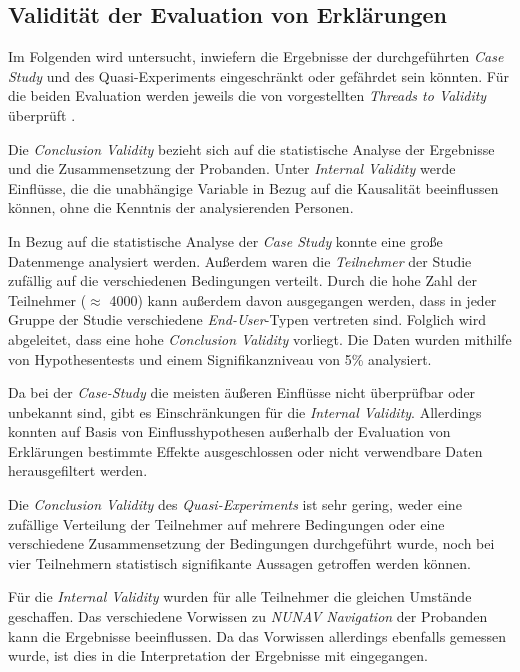 \subsection{Validität der Evaluation von Erklärungen}

Im Folgenden wird untersucht, inwiefern die Ergebnisse der durchgeführten \textit{Case Study} und des Quasi-Experiments eingeschränkt oder gefährdet sein könnten. Für die beiden Evaluation werden jeweils die von \citeauthor{wohlin2012experimentation} vorgestellten \textit{Threads to Validity} überprüft \cite{wohlin2012experimentation}.

Die \textit{Conclusion Validity} bezieht sich auf die statistische Analyse der Ergebnisse und die Zusammensetzung der Probanden. Unter \textit{Internal Validity} werde Einflüsse, die die unabhängige Variable in Bezug auf die Kausalität beeinflussen können, ohne die Kenntnis der analysierenden Personen.

In Bezug auf die statistische Analyse der \textit{Case Study} konnte eine große Datenmenge analysiert werden. Außerdem waren die \textit{Teilnehmer} der Studie zufällig auf die verschiedenen Bedingungen verteilt. Durch die hohe Zahl der Teilnehmer ($\approx$ 4000) kann außerdem davon ausgegangen werden, dass in jeder Gruppe der Studie verschiedene \textit{End-User}-Typen vertreten sind. Folglich wird abgeleitet, dass eine hohe \textit{Conclusion Validity} vorliegt. Die Daten wurden mithilfe von Hypothesentests und einem Signifikanzniveau von 5\% analysiert.

Da bei der \textit{Case-Study} die meisten äußeren Einflüsse nicht überprüfbar oder unbekannt sind, gibt es Einschränkungen für die \textit{Internal Validity}. Allerdings konnten auf Basis von Einflusshypothesen außerhalb der Evaluation von Erklärungen bestimmte Effekte ausgeschlossen oder nicht verwendbare Daten herausgefiltert werden.

\smallskip

Die \textit{Conclusion Validity} des \textit{Quasi-Experiments} ist sehr gering, weder eine zufällige Verteilung der Teilnehmer auf mehrere Bedingungen oder eine verschiedene Zusammensetzung der Bedingungen durchgeführt wurde, noch bei vier Teilnehmern statistisch signifikante Aussagen getroffen werden können.

Für die \textit{Internal Validity} wurden für alle Teilnehmer die gleichen Umstände geschaffen. Das verschiedene Vorwissen zu \textit{NUNAV Navigation} der Probanden kann die Ergebnisse beeinflussen. Da das Vorwissen allerdings ebenfalls gemessen wurde, ist dies in die Interpretation der Ergebnisse mit eingegangen.

